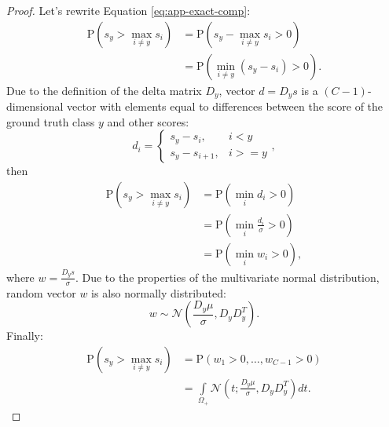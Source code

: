\documentclass[nohyperref]{article}
\theoremstyle{plain}
\theoremstyle{definition}
\theoremstyle{remark}
\begin{document}
\begin{proof}
Let's rewrite Equation \ref{eq:app-exact-comp}:
\begin{align}
    \mathrm{P}(s_y > \max\limits_{i \ne y} s_i)
    &= \mathrm{P}(s_y - \max\limits_{i \ne y} s_i > 0) \\
    &= \mathrm{P}(\min\limits_{i \ne y}( s_y - s_i) > 0).
\end{align}
Due to the definition of the delta matrix $D_y$, vector $d = D_ys$ is a $(C - 1)$-dimensional vector with elements equal to differences between the score of the ground truth class $y$ and other scores:
\begin{equation}
    d_i = \begin{cases}
    s_y - s_i, & i < y \\
    s_y - s_{i + 1}, & i >= y
    \end{cases},
\end{equation}
then
\begin{align}
    \mathrm{P}(s_y > \max\limits_{i \ne y} s_i)
    &= \mathrm{P}(\min\limits_i d_i > 0) \\
    &= \mathrm{P}(\min\limits_i \frac{d_i}{\sigma} > 0) \\
    &= \mathrm{P}(\min\limits_i w_i > 0),
\end{align}
where $w = \frac{D_y s}{\sigma}$. Due to the properties of the multivariate normal distribution, random vector $w$ is also normally distributed:
\begin{equation}
    w \sim \mathcal{N}(\frac{D_y\mu}{\sigma}, D_yD_y^T).
\end{equation}
Finally:
\begin{align}
    \mathrm{P}(s_y > \max\limits_{i \ne y} s_i)
    &= \mathrm{P}(w_1 > 0, \dots, w_{C - 1} > 0) \\
    &= \int\limits_{\Omega_+}\mathcal{N}(t; \frac{D_y\mu}{\sigma}, D_yD_y^T) dt.
\end{align}
\end{proof}
\end{document}
